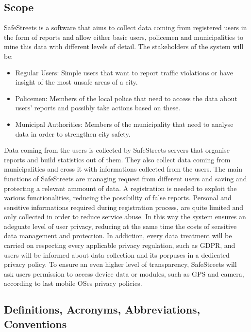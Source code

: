 \subsection{Scope}
SafeStreets is a software that aims to collect data coming from registered users in the form of reports and allow either basic users, policemen and municipalities to mine this data with different levels of detail.
The stakeholders of the system will be:
\begin{itemize}
	\item Regular Users: Simple users that want to report traffic violations or have insight of the most unsafe areas of a city.
	\item Policemen: Members of the local police that need to access the data about users' reports and possibly take actions based on these. 
	\item Municipal Authorities: Members of the municipality that need to analyse data in order to strengthen city safety.
\end{itemize}
Data coming from the users is collected by SafeStreets servers that organise reports and build statistics out of them.
They also collect data coming from municipalities and cross it with informations collected from the users.
The main functions of SafeStreets are managing request from different users and saving and protecting a relevant ammount of data.\newline
A registration is needed to exploit the various functionalities, reducing the possibility of false reports. Personal and sensitive informations required during registration process, are quite limited and only collected in order to reduce service abuse. In this way the system ensures an adeguate level of user privacy, reducing at the same time the costs of sensitive data management and protection.\newline
In addiction, every data treatment will be carried on respecting every applicable privacy regulation, such as GDPR, and users will be informed about data collection and its porpuses in a dedicated privacy policy.\newline
To ensure an even higher level of transparency, SafeStreets will ask users permission to access device data or modules, such as GPS and camera, according to last mobile OSes privacy policies.

\subsection{Definitions, Acronyms, Abbreviations, Conventions}
